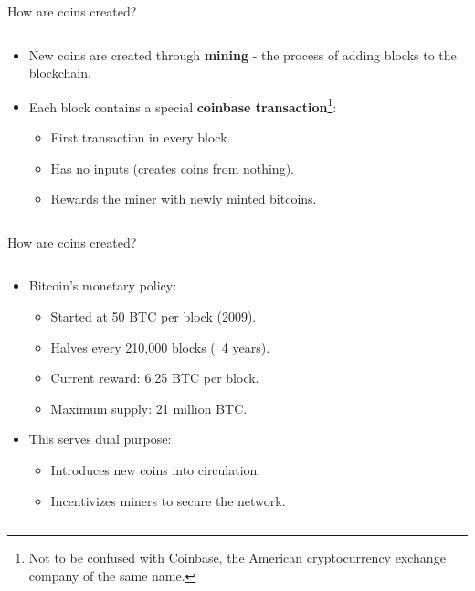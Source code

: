 \documentclass[aspectratio=169, lualatex, handout]{beamer}
\begin{document}
\begin{frame}{How are coins created?}
	\begin{columns}[c]
		\begin{column}{1\textwidth}
			\begin{itemize}
				\item New coins are created through \textbf{mining} - the process of adding blocks to the blockchain.
				\item Each block contains a special \textbf{coinbase transaction}\footnote{Not to be confused with Coinbase, the American cryptocurrency exchange company of the same name.}:
				      \begin{itemize}
					      \item First transaction in every block.
					      \item Has no inputs (creates coins from nothing).
					      \item Rewards the miner with newly minted bitcoins.
				      \end{itemize}
			\end{itemize}
		\end{column}
	\end{columns}
\end{frame}

\begin{frame}{How are coins created?}
	\begin{columns}[c]
		\begin{column}{1\textwidth}
			\begin{itemize}
				\item Bitcoin's monetary policy:
				      \begin{itemize}
					      \item Started at 50 BTC per block (2009).
					      \item Halves every 210,000 blocks (~4 years).
					      \item Current reward: 6.25 BTC per block.
					      \item Maximum supply: 21 million BTC.
				      \end{itemize}
				\item This serves dual purpose:
				      \begin{itemize}
					      \item Introduces new coins into circulation.
					      \item Incentivizes miners to secure the network.
				      \end{itemize}
			\end{itemize}
		\end{column}
	\end{columns}
\end{frame}
\end{document}
